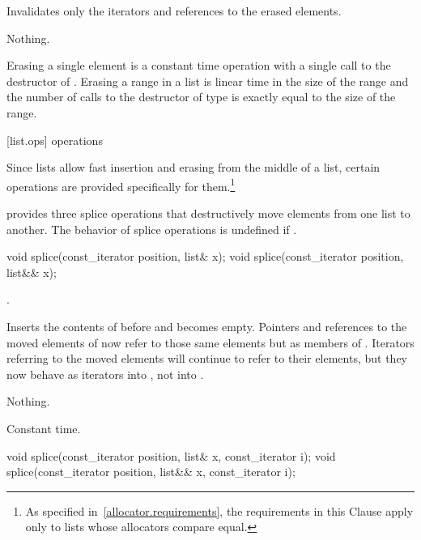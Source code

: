 \begin{itemdescr}
\pnum
\effects
Invalidates only the iterators and references to the erased elements.

\pnum
\throws Nothing.

\pnum
\complexity
Erasing a single element is a constant time operation with a single call to the destructor of
.
Erasing a range in a list is linear time in the
size of the range and the number of calls to the destructor of type
is exactly equal to the size of the range.
\end{itemdescr}

[list.ops]{ operations}

\pnum
Since lists allow fast insertion and erasing from the middle of a list, certain
operations are provided specifically for them.\footnote{As specified
in~\ref{allocator.requirements}, the requirements in this Clause apply only to
lists whose allocators compare equal.}

\pnum
{} provides three splice operations that destructively move elements from one list to
another. The behavior of splice operations is undefined if .

%
\begin{itemdecl}
void splice(const_iterator position, list& x);
void splice(const_iterator position, list&& x);
\end{itemdecl}

\begin{itemdescr}
\pnum
\requires
{}.

\pnum
\effects
Inserts the contents of
before
and
becomes empty.
Pointers and references to the moved elements of
now refer to those same elements but as members of
.
Iterators referring to the moved elements will continue to refer to their
elements, but they now behave as iterators into
,
not into
.

\pnum
\throws Nothing.

\pnum
\complexity
Constant time.
\end{itemdescr}

%
%
\begin{itemdecl}
void splice(const_iterator position, list& x, const_iterator i);
void splice(const_iterator position, list&& x, const_iterator i);
\end{itemdecl}

